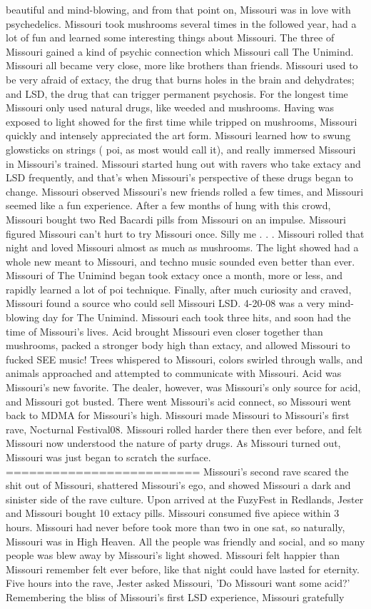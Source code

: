 \documentclass[12pt]{book}
\begin{document}
beautiful and mind-blowing, and from that point on, Missouri was in love with psychedelics. Missouri took mushrooms several times in the followed year, had a lot of fun and learned some interesting things about Missouri. The three of Missouri gained a kind of psychic connection which Missouri call The Unimind. Missouri all became very close, more like brothers than friends. Missouri used to be very afraid of extacy, the drug that burns holes in the brain and dehydrates; and LSD, the drug that can trigger permanent psychosis. For the longest time Missouri only used natural drugs, like weeded and mushrooms. Having was exposed to light showed for the first time while tripped on mushrooms, Missouri quickly and intensely appreciated the art form. Missouri learned how to swung glowsticks on strings ( poi, as most would call it), and really immersed Missouri in Missouri's trained. Missouri started hung out with ravers who take extacy and LSD frequently, and that's when Missouri's perspective of these drugs began to change. Missouri observed Missouri's new friends rolled a few times, and Missouri seemed like a fun experience. After a few months of hung with this crowd, Missouri bought two Red Bacardi pills from Missouri on an impulse. Missouri figured Missouri can't hurt to try Missouri once. Silly me . . .  Missouri rolled that night and loved Missouri almost as much as mushrooms. The light showed had a whole new meant to Missouri, and techno music sounded even better than ever. Missouri of The Unimind began took extacy once a month, more or less, and rapidly learned a lot of poi technique. Finally, after much curiosity and craved, Missouri found a source who could sell Missouri LSD. 4-20-08 was a very mind-blowing day for The Unimind. Missouri each took three hits, and soon had the time of Missouri's lives. Acid brought Missouri even closer together than mushrooms, packed a stronger body high than extacy, and allowed Missouri to fucked SEE music! Trees whispered to Missouri, colors swirled through walls, and animals approached and attempted to communicate with Missouri. Acid was Missouri's new favorite. The dealer, however, was Missouri's only source for acid, and Missouri got busted. There went Missouri's acid connect, so Missouri went back to MDMA for Missouri's high. Missouri made Missouri to Missouri's first rave, Nocturnal Festival08. Missouri rolled harder there then ever before, and felt Missouri now understood the nature of party drugs. As Missouri turned out, Missouri was just began to scratch the surface. ========================= Missouri's second rave scared the shit out of Missouri, shattered Missouri's ego, and showed Missouri a dark and sinister side of the rave culture. Upon arrived at the FuzyFest in Redlands, Jester and Missouri bought 10 extacy pills. Missouri consumed five apiece within 3 hours. Missouri had never before took more than two in one sat, so naturally, Missouri was in High Heaven. All the people was friendly and social, and so many people was blew away by Missouri's light showed. Missouri felt happier than Missouri remember felt ever before, like that night could have lasted for eternity. Five hours into the rave, Jester asked Missouri, 'Do Missouri want some acid?' Remembering the bliss of Missouri's first LSD experience, Missouri gratefully 
\end{document}
